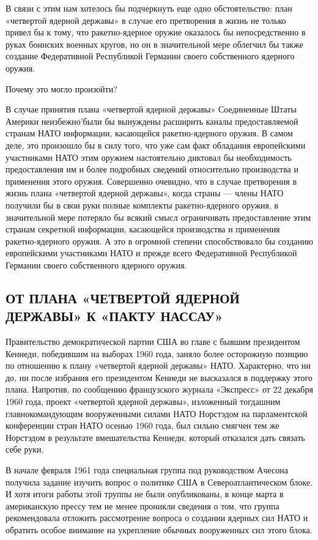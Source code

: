 \documentclass[12pt, a4paper, openany]{book}
\begin{document}
	В связи с этим нам хотелось бы подчеркнуть еще одно обстоятельство: план «четвертой ядерной державы» в случае его претворения в жизнь не только привел бы к тому, что ракетно-ядерное оружие оказалось бы непосредственно в руках боннских военных кругов, но он в значительной мере облегчил бы также создание Федеративной Республикой Германии своего собственного ядерного оружия.
	
	Почему это могло произойти?
	
	В случае принятия плана «четвертой ядерной державы» Соединенные Штаты Америки неизбежно'были бы вынуждены расширить каналы предоставляемой странам НАТО информации, касающейся ракетно-ядерного оружия. В самом деле, это произошло бы в силу того, что уже сам факт обладания европейскими участниками НАТО этим оружием настоятельно диктовал бы необходимость предоставления им и более подробных сведений относительно производства и применения этого оружия. Совершенно очевидно, что в случае претворения в жизнь плана «четвертой ядерной державы», когда страны — члены НАТО получили бы в свои руки полные комплекты ракетно-ядерного оружия, в значительной мере потеряло бы всякий смысл ограничивать предоставление этим странам секретной информации, касающейся производства и применения ракетно-ядерного оружия. А это в огромной степени способствовало бы созданию европейскими участниками НАТО и прежде всего Федеративной Республикой Германии своего собственного ядерного оружия.
	
			\subsection[От плана «четвертой ядерной державы» к «пакту Нассау»]{\center ОТ ПЛАНА «ЧЕТВЕРТОЙ ЯДЕРНОЙ ДЕРЖАВЫ» К «ПАКТУ НАССАУ»}

	
	Правительство демократической партии США во главе с бывшим президентом Кеннеди, победившим на выборах 1960 года, заняло более осторожную позицию по отношению к плану «четвертой ядерной державы» НАТО. Характерно, что ни до, ни после избрания его президентом Кеннеди не высказался в поддержку этого плана. Напротив, по сообщению французского журнала «Экспресс» от 22 декабря 1960 года, проект «четвертой ядерной державы», изложенный тогдашним главнокомандующим вооруженными силами НАТО Норстэдом на парламентской конференции стран НАТО осенью 1960 года, был сильно смягчен тем же Норстэдом в результате вмешательства Кеннеди, который отказался дать связать себе руки.
	
	В начале февраля 1961 года специальная группа под руководством Ачесона получила задание изучить вопрос о политике США в Североатлантическом блоке. И хотя итоги работы этой труппы не были опубликованы, в конце марта в американскую прессу тем не менее проникли сведения о том, что группа рекомендовала отложить рассмотрение вопроса о создании ядерных сил НАТО и обратить особое внимание на укрепление обычных вооруженных сил этого блока.
	
\end{document}

